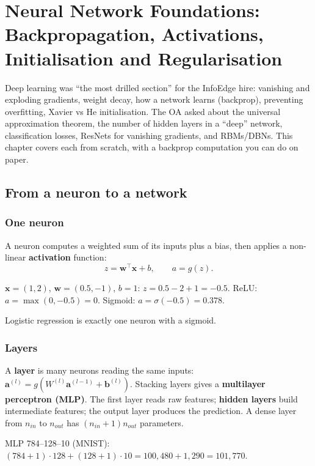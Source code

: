 \chapter{Neural Network Foundations: Backpropagation, Activations, Initialisation and Regularisation}

Deep learning was ``the most drilled section'' for the InfoEdge hire: vanishing and exploding gradients, weight decay, how a network
learns (backprop), preventing overfitting, Xavier vs He initialisation. The OA asked about the universal approximation theorem, the
number of hidden layers in a ``deep'' network, classification losses, ResNets for vanishing gradients, and RBMs/DBNs. This chapter
covers each from scratch, with a backprop computation you can do on paper.

\section{From a neuron to a network}
\subsection{One neuron}
A neuron computes a weighted sum of its inputs plus a bias, then applies a non-linear \textbf{activation} function:
\[ z = \mathbf w^\top\mathbf x + b,\qquad a = g(z). \]
\begin{example}
$\mathbf x = (1, 2)$, $\mathbf w = (0.5, -1)$, $b = 1$: $z = 0.5 - 2 + 1 = -0.5$. ReLU: $a = \max(0, -0.5) = 0$. Sigmoid: $a = \sigma(-0.5) = 0.378$.
\end{example}
Logistic regression is exactly one neuron with a sigmoid.

\subsection{Layers}
A \textbf{layer} is many neurons reading the same inputs: $\mathbf a^{(l)} = g(W^{(l)}\mathbf a^{(l-1)} + \mathbf b^{(l)})$. Stacking layers gives a
\textbf{multilayer perceptron (MLP)}. The first layer reads raw features; \textbf{hidden layers} build intermediate features; the output layer produces
the prediction. A dense layer from $n_{in}$ to $n_{out}$ has $(n_{in} + 1)n_{out}$ parameters.
\begin{example}
MLP 784--128--10 (MNIST): $(784 + 1)\cdot128 + (128 + 1)\cdot10 = 100{,}480 + 1{,}290 = 101{,}770$.
\end{example}

